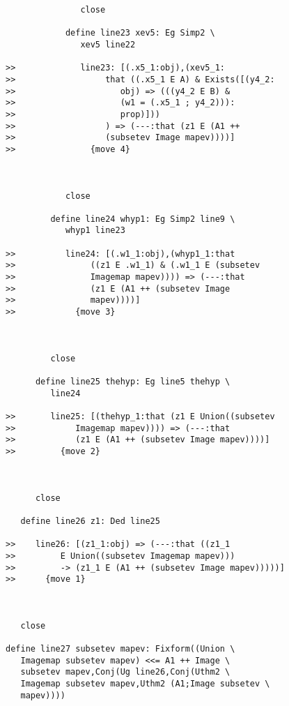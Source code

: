 \documentclass[12pt]{article}
\begin{document}
\begin{verbatim}
               close

            define line23 xev5: Eg Simp2 \
               xev5 line22

>>             line23: [(.x5_1:obj),(xev5_1:
>>                  that ((.x5_1 E A) & Exists([(y4_2:
>>                     obj) => (((y4_2 E B) &
>>                     (w1 = (.x5_1 ; y4_2))):
>>                     prop)]))
>>                  ) => (---:that (z1 E (A1 ++
>>                  (subsetev Image mapev))))]
>>               {move 4}



            close

         define line24 whyp1: Eg Simp2 line9 \
            whyp1 line23

>>          line24: [(.w1_1:obj),(whyp1_1:that
>>               ((z1 E .w1_1) & (.w1_1 E (subsetev
>>               Imagemap mapev)))) => (---:that
>>               (z1 E (A1 ++ (subsetev Image
>>               mapev))))]
>>            {move 3}



         close

      define line25 thehyp: Eg line5 thehyp \
         line24

>>       line25: [(thehyp_1:that (z1 E Union((subsetev
>>            Imagemap mapev)))) => (---:that
>>            (z1 E (A1 ++ (subsetev Image mapev))))]
>>         {move 2}



      close

   define line26 z1: Ded line25

>>    line26: [(z1_1:obj) => (---:that ((z1_1
>>         E Union((subsetev Imagemap mapev)))
>>         -> (z1_1 E (A1 ++ (subsetev Image mapev)))))]
>>      {move 1}



   close

define line27 subsetev mapev: Fixform((Union \
   Imagemap subsetev mapev) <<= A1 ++ Image \
   subsetev mapev,Conj(Ug line26,Conj(Uthm2 \
   Imagemap subsetev mapev,Uthm2 (A1;Image subsetev \
   mapev))))


\end{verbatim}
\end{document}
